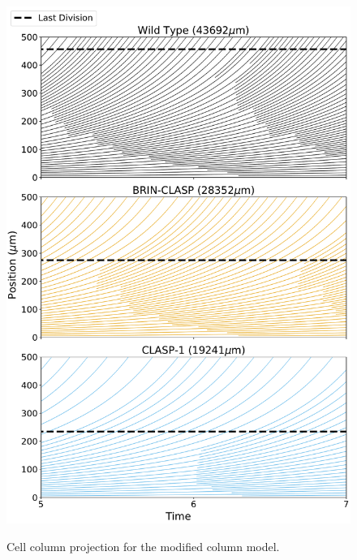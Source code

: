 \documentclass[referee,pdflatex,sn-mathphys-num]{sn-jnl}
\begin{document}
\begin{appendices}
\begin{figure}
  \centering
  \includegraphics[height=500pt]{column-modified-profile.pdf}
  \caption{Cell column projection for the modified column model.}
\end{figure}


\end{appendices}
\end{document}
